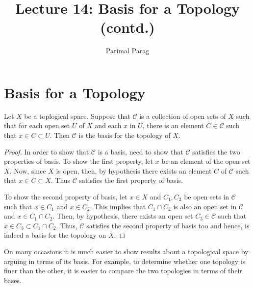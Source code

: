 \documentclass[a4paper,english,12pt]{article}
\newcommand{\C}{\mathcal{C}}
\begin{document}
\title{Lecture 14: Basis for a Topology (contd.)}
\author{Parimal Parag}
\maketitle


\section{Basis for a Topology}

\begin{lem} \label{basis_alternate_defn_2}
 Let $X$ be a toplogical space. Suppose that $\C$ is a collection of open sets of $X$ such that for each open set $U$ of $X$
 and each $x$ in $U$, there is an element $C \in \C$ such that $x \in  C \subset U$. Then $\C$ is the basis for the topology of $X$.
\end{lem}
\begin{proof}
In order to show that $\C$ is a basis, need to show that $\C$ satisfies the two properties of basis. To show the first property, let $x$ be an element of the open 
set $X$. Now, since $X$ is open, then, by hypothesis there exists an element $C$ of $\C$ such that $x \in C \subset X$. Thus $\C$ satisfies the first property of 
basis. 

To show the second property of basis, let $x \in X$ and $C_{1}, C_{2}$ be open sets in $\C$ such that $x \in C_{1}$ and $x \in C_{2}$. This implies that 
$C_{1} \cap C_{2}$ is also an open set in $\C$ and $x \in C_{1} \cap C_{2}$. Then, by hypothesis, there exists an open set $C_{3} \in \C$ such that
$x \in C_{3} \subset C_{1} \cap C_{2}$. Thus, $\C$ satisfies the second property of basis too and hence, is indeed a basis for the topology on $X$.
\end{proof}

On many occasions it is much easier to show results about a topological space by arguing in terms of its basis. For example, to determine whether one 
topology is finer than the other, it is easier to compare the two topologies in terms of their bases.
\end{document}
